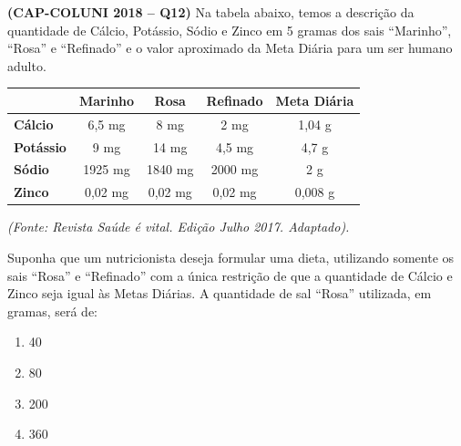 \textbf{(CAP-COLUNI 2018 -- Q12)} Na tabela abaixo, temos a descrição da quantidade de Cálcio, Potássio, Sódio e Zinco em 5 gramas dos sais ``Marinho'', ``Rosa'' e ``Refinado'' e o valor aproximado da Meta Diária para um ser humano adulto.

\begin{center}
\scriptsize
\begin{tabular}{l|c|c|c|c}
 & \textbf{Marinho} & \textbf{Rosa} & \textbf{Refinado} & \textbf{Meta Diária}\\ \hline
\textbf{Cálcio} & 6,5 mg & 8 mg & 2 mg & 1,04 g\\
\textbf{Potássio} & 9 mg & 14 mg & 4,5 mg & 4,7 g\\
\textbf{Sódio} & 1925 mg & 1840 mg & 2000 mg & 2 g\\
\textbf{Zinco} & 0,02 mg & 0,02 mg & 0,02 mg & 0,008 g
\end{tabular}
\end{center}
\textit{(Fonte: Revista Saúde é vital. Edição Julho 2017. Adaptado).}

Suponha que um nutricionista deseja formular uma dieta, utilizando somente os sais ``Rosa'' e ``Refinado'' com a única restrição de que a quantidade de Cálcio e Zinco seja igual às Metas Diárias. A quantidade de sal ``Rosa'' utilizada, em gramas, será de:

\begin{enumerate}
	\item 40
	\item 80
	\item 200
	\item 360
\end{enumerate}
